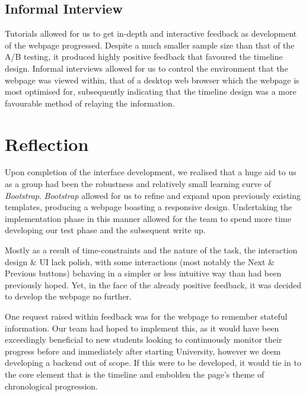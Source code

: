 \documentclass[a4paper, notoc]{tufte-handout}
\begin{document}
\subsection{Informal Interview}\label{subsec:interview}

Tutorials allowed for us to get in-depth and interactive feedback as development of the webpage progressed. Despite a much smaller sample size than that of the A/B testing, it produced highly positive feedback that favoured the timeline design. Informal interviews allowed for us to control the environment that the webpage was viewed within, that of a desktop web browser which the webpage is most optimised for, subsequently indicating that the timeline design was a more favourable method of relaying the information.

\section{Reflection}


Upon completion of the interface development, we realised that a huge aid to us as a group had been 
the robustness and relatively small learning curve of \textit{Bootstrap}. \textit{Bootstrap} 
allowed for us to refine and expand upon previously existing templates, producing a webpage 
boasting a responsive design. Undertaking the implementation phase in this manner allowed for 
the team to spend more time developing our test phase and the subsequent write up.

Mostly as a result of time-constraints and the nature of the task, the interaction design \& UI lack 
polish, with some interactions (most notably the Next \& Previous buttons) behaving in a simpler 
or less intuitive way than had been previously hoped. Yet, in the face of the already positive feedback, it was 
decided to develop the webpage no further.

One request raised within feedback was for the webpage to remember stateful information. Our 
team had hoped to implement this, as it would have been exceedingly beneficial to new students 
looking to continuously monitor their progress before and immediately after starting University, 
however we deem developing a backend out of scope. If this were to be developed, it would tie 
in to the core element that is the timeline and embolden the page's theme of chronological progression.
\end{document}
